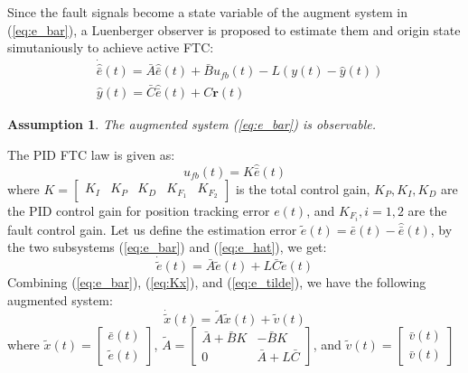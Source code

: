 \documentclass{ieeeaccess}
\newtheorem{assumption}{Assumption}[section]
\begin{document}
Since the fault signals become a state variable of the augment system in (\ref{eq:e_bar}), a Luenberger observer is proposed to estimate them and origin state simutaniously to achieve active FTC:
\begin{equation} \label{eq:e_hat}
    \begin{split}
        & \dot{\hat{\bar{e}}}(t)=\bar{A}\hat{\bar{e}}(t)+\bar{B}u_{fb}(t)-{L}(y(t)-\hat{y}(t)) \\
        & \hat{y}(t)=\bar{C}\hat{\bar{e}}(t) + C\pmb{r}(t)
    \end{split}
\end{equation}
\begin{assumption}
    The augmented system (\ref{eq:e_bar}) is observable.
\end{assumption}
The PID FTC law is given as:
\begin{equation} \label{eq:Kx}
    u_{fb}(t)=K\hat{\bar{e}}(t)
\end{equation}
where $K = \begin{bmatrix}
    K_I & K_P & K_D & K_{F_1} & K_{F_2}
\end{bmatrix}$ is the total control gain, $K_P,K_I,K_D$ are the PID control gain for position tracking error $e(t)$, and $K_{F_i}, i=1,2$ are the fault control gain. Let us define the estimation error $\tilde{e}(t)=\bar{e}(t)-\hat{\bar{e}}(t)$, by the two subsystems (\ref{eq:e_bar}) and (\ref{eq:e_hat}), we get:
\begin{equation} \label{eq:e_tilde}
    \dot{\tilde{e}}(t) = \bar{A}\tilde{e}(t) +L\bar{C}\tilde{e}(t)
\end{equation}
Combining (\ref{eq:e_bar}), (\ref{eq:Kx}), and (\ref{eq:e_tilde}), we have the following augmented system:
\begin{equation} \label{eq:aug}
    \dot{\tilde{x}}(t) = \tilde{A}\tilde{x}(t)+\tilde{v}(t)
\end{equation}
where $\tilde{x}(t)=\begin{bmatrix}
    \bar{e}(t) \\ \tilde{e}(t)
\end{bmatrix}$, $\tilde{A}=\begin{bmatrix}
    \bar{A}+\bar{B}K & -\bar{B}K \\ 0 & \bar{A}+L\bar{C}
\end{bmatrix}$, and $\tilde{v}(t)=\begin{bmatrix}
    \bar{v}(t) \\ \bar{v}(t)
\end{bmatrix}$
\end{document}
